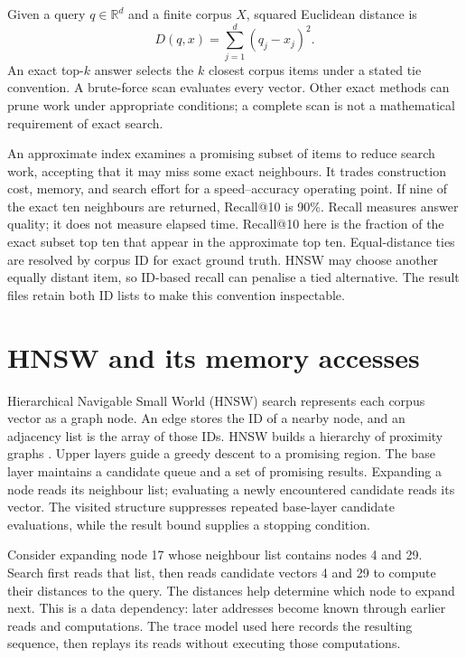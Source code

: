 \documentclass[11pt,a4paper]{report}
\begin{document}
Given a query $q\in\mathbb{R}^{d}$ and a finite corpus $X$, squared Euclidean distance is
\begin{equation}
 D(q,x)=\sum_{j=1}^{d}(q_j-x_j)^2.
\end{equation}
An exact top-$k$ answer selects the $k$ closest corpus items under a stated tie convention. A brute-force scan evaluates every vector. Other exact methods can prune work under appropriate conditions; a complete scan is not a mathematical requirement of exact search.

An approximate index examines a promising subset of items to reduce search work, accepting that it may miss some exact neighbours. It trades construction cost, memory, and search effort for a speed--accuracy operating point. If nine of the exact ten neighbours are returned, Recall@10 is 90\%. Recall measures answer quality; it does not measure elapsed time. Recall@10 here is the fraction of the exact subset top ten that appear in the approximate top ten. Equal-distance ties are resolved by corpus ID for exact ground truth. HNSW may choose another equally distant item, so ID-based recall can penalise a tied alternative. The result files retain both ID lists to make this convention inspectable.

\section{HNSW and its memory accesses}
Hierarchical Navigable Small World (HNSW) search represents each corpus vector as a graph node. An edge stores the ID of a nearby node, and an adjacency list is the array of those IDs. HNSW builds a hierarchy of proximity graphs \cite{hnsw}. Upper layers guide a greedy descent to a promising region. The base layer maintains a candidate queue and a set of promising results. Expanding a node reads its neighbour list; evaluating a newly encountered candidate reads its vector. The visited structure suppresses repeated base-layer candidate evaluations, while the result bound supplies a stopping condition.

Consider expanding node 17 whose neighbour list contains nodes 4 and 29. Search first reads that list, then reads candidate vectors 4 and 29 to compute their distances to the query. The distances help determine which node to expand next. This is a data dependency: later addresses become known through earlier reads and computations. The trace model used here records the resulting sequence, then replays its reads without executing those computations.
\end{document}
